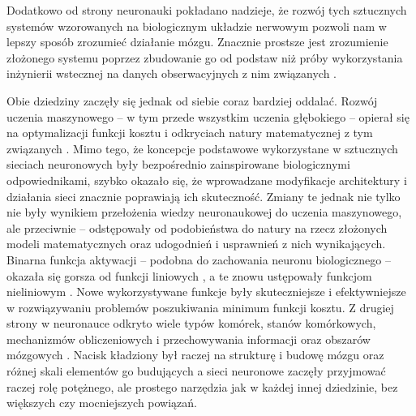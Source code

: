 Dodatkowo od strony neuronauki pokładano nadzieje, że rozwój tych sztucznych systemów wzorowanych na biologicznym układzie nerwowym pozwoli nam w lepszy sposób zrozumieć działanie mózgu.
Znacznie prostsze jest zrozumienie złożonego systemu poprzez zbudowanie go od podstaw niż próby wykorzystania inżynierii wstecznej na danych obserwacyjnych z nim związanych \cite{braitenberg1986vehicles}.

Obie dziedziny zaczęły się jednak od siebie coraz bardziej oddalać.
Rozwój uczenia maszynowego -- w tym przede wszystkim uczenia głębokiego -- opierał się na optymalizacji funkcji kosztu i odkryciach natury matematycznej z tym związanych \cite{sutskever2013importance}.
Mimo tego, że koncepcje podstawowe wykorzystane w sztucznych sieciach neuronowych były bezpośrednio zainspirowane biologicznymi odpowiednikami, szybko okazało się, że wprowadzane modyfikacje architektury i działania sieci znacznie poprawiają ich skuteczność.
Zmiany te jednak nie tylko nie były wynikiem przełożenia wiedzy neuronaukowej do uczenia maszynowego, ale przeciwnie -- odstępowały od podobieństwa do natury na rzecz złożonych modeli matematycznych oraz udogodnień i usprawnień z nich wynikających.
Binarna funkcja aktywacji -- podobna do zachowania neuronu biologicznego -- okazała się gorsza od funkcji liniowych \cite{minsky2017perceptrons}, a te znowu ustępowały funkcjom nieliniowym \cite{haykin1994neural}.
Nowe wykorzystywane funkcje były skuteczniejsze i efektywniejsze \cite{sharma2017activation} w rozwiązywaniu problemów poszukiwania minimum funkcji kosztu.
Z drugiej strony w neuronauce odkryto wiele typów komórek, stanów komórkowych, mechanizmów obliczeniowych i przechowywania informacji oraz obszarów mózgowych \cite{solari2011cognitive}.
Nacisk kładziony był raczej na strukturę i budowę mózgu oraz różnej skali elementów go budujących a sieci neuronowe zaczęły przyjmować raczej rolę potężnego, ale prostego narzędzia jak w każdej innej dziedzinie, bez większych czy mocniejszych powiązań.
